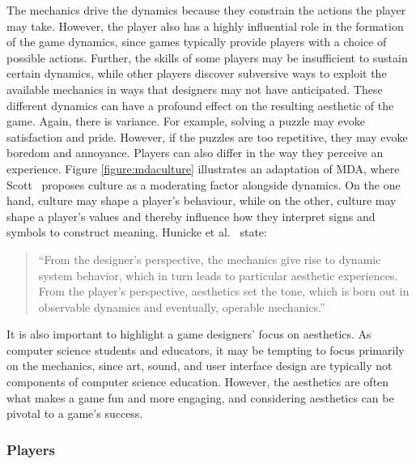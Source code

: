 \documentclass{sig-alternate-05-2015}
\begin{document}
The mechanics drive the dynamics because they constrain the actions the player may take. However, the player also has a highly influential role in the formation of the game dynamics, since games typically provide players with a choice of possible actions. Further, the skills of some players may be insufficient to sustain certain dynamics, while other players discover subversive ways to exploit the available mechanics in ways that designers may not have anticipated. These different dynamics can have a profound effect on the resulting aesthetic of the game. Again, there is variance. For example, solving a puzzle may evoke satisfaction and pride. However, if the puzzles are too repetitive, they may evoke boredom and annoyance. Players can also differ in the way they perceive an experience. Figure \ref{figure:mdaculture} illustrates an adaptation of MDA, where Scott~\cite{scott2012-monument} proposes culture as a moderating factor alongside dynamics. On the one hand, culture may shape a player's behaviour, while on the other, culture may shape a player's values and thereby influence how they interpret signs and symbols to construct meaning. Hunicke et al.~\cite{hunicke2004mda} state:

\begin{quote}


``From the designer's perspective, the mechanics give rise to dynamic system behavior, which in turn leads to particular aesthetic experiences. From the player's perspective, aesthetics set the tone, which is born out in observable dynamics and eventually, operable mechanics.''\end{quote}




It is also important to highlight a game designers' focus on aesthetics. As computer science students and educators, it may be tempting to focus primarily on the mechanics, since art, sound, and user interface design are typically not components of computer science education. However, the aesthetics are often what makes a game fun and more engaging, and considering aesthetics can be pivotal to a game's success. \subsubsection{Players}


\label{section:players}
\end{document}
